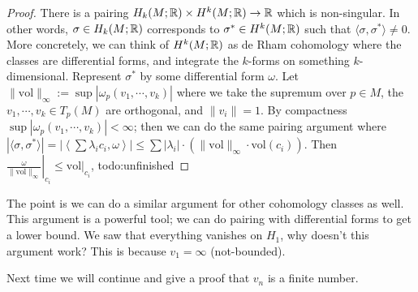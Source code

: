\begin{proof}
    There is a pairing $H_k(M;\mathbb{R}) \times H^k(M;\mathbb{R}) \to \mathbb{R}$ which is non-singular. In other words, $\sigma \in H_k(M;\mathbb{R})$ corresponds to $\sigma^* \in H^k(M;\mathbb{R})$ such that $\langle \sigma,\sigma^* \rangle \neq 0$. More concretely, we can think of $H^k(M;\mathbb{R})$ as de Rham cohomology where the classes are differential forms, and integrate the $k$-forms on something $k$-dimensional. Represent $\sigma^*$ by some differential form $\omega$. Let $\|\mathrm{vol}\|_{\infty}:=\sup|\omega_p(v_1, \cdots ,v_k)|$ where we take the supremum over $p \in M$, the $v_1, \cdots ,v_k \in T_p(M)$ are orthogonal, and $\|v_i \|=1$. By compactness $\sup |\omega_p(v_1,\cdots ,v_k)| < \infty$; then we can do the same pairing argument where $|\langle \sigma,\sigma^* \rangle |=\left|\left\langle  \sum \lambda_i c_i ,\omega\right\rangle\right| \leq \sum |\lambda_i | \cdot \left( \|\mathrm{vol}\|_{\infty }\cdot \mathrm{vol}(c_i ) \right) $. 
    Then $\left. \frac{\omega}{\|\mathrm{vol}\|_{\infty}} \right| _{c_i }\leq \left. \mathrm{vol} \right| _{c_i }$, {\color{red}todo:unfinished} 
\end{proof}
The point is we can do a similar argument for other cohomology classes as well. This argument is a powerful tool; we can do pairing with differential forms to get a lower bound. We saw that everything vanishes on $H_1$, why doesn't this argument work? This is because $v_1= \infty$ (not-bounded).

Next time we will continue and give a proof that $v_n $ is a finite number.
